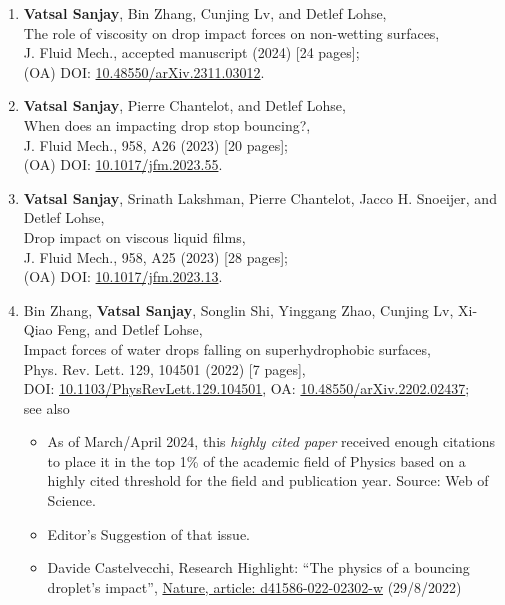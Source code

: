 \documentclass[11pt,a4paper,roman,english,colorlinks,linkcolor={red!50!black}]{moderncv}
\begin{document}
\begin{enumerate}[leftmargin=0.75cm]
	\item \textbf{Vatsal Sanjay}, Bin Zhang, Cunjing Lv, and Detlef Lohse,\\
	The role of viscosity on drop impact forces on non-wetting surfaces,\\
	J. Fluid Mech., accepted manuscript (2024) [24 pages];\\
	(OA) DOI: \href{https://doi.org/10.48550/arXiv.2311.03012}{10.48550/arXiv.2311.03012}.

	\item \textbf{Vatsal Sanjay}, Pierre Chantelot, and Detlef Lohse,\\
	When does an impacting drop stop bouncing?,\\
	J. Fluid Mech., 958, A26 (2023) [20 pages];\\
	(OA) DOI: \href{https://doi.org/10.1017/jfm.2023.55}{10.1017/jfm.2023.55}.

	\item \textbf{Vatsal Sanjay}, Srinath Lakshman, Pierre Chantelot, Jacco H. Snoeijer, and Detlef Lohse,\\
	Drop impact on viscous liquid films,\\
	J. Fluid Mech., 958, A25 (2023) [28 pages];\\
	(OA) DOI: \href{https://doi.org/10.1017/jfm.2023.13}{10.1017/jfm.2023.13}.

	\item Bin Zhang, \textbf{Vatsal Sanjay}, Songlin Shi,  Yinggang Zhao,  Cunjing Lv,  Xi-Qiao Feng,  and Detlef Lohse,\\
	Impact forces of water drops falling on superhydrophobic surfaces,\\
	Phys. Rev. Lett. 129, 104501 (2022) [7 pages],\\
	DOI: \href{https://doi.org/10.1103/PhysRevLett.129.104501}{10.1103/PhysRevLett.129.104501}, OA:  \href{https://doi.org/10.48550/arXiv.2202.02437}{10.48550/arXiv.2202.02437};\\
	see also
	\begin{itemize}
		\item
		As of March/April 2024, this \textit{highly cited paper} received enough citations to place it in the top 1\% of the academic field of Physics based on a highly cited threshold for the field and publication year. Source: Web of Science.
		\item
		Editor's Suggestion of that issue.
		\item
		Davide Castelvecchi, Research Highlight: ``The physics of a bouncing droplet's impact'', \href{https://www.nature.com/articles/d41586-022-02302-w}{Nature, article: d41586-022-02302-w} (29/8/2022)
	\end{itemize}


\end{enumerate}
\end{document}
